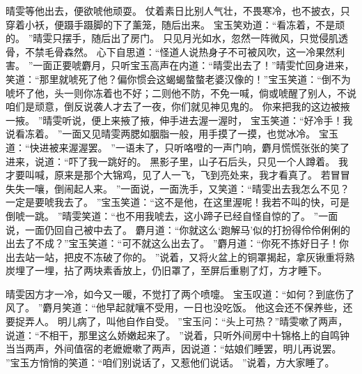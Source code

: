 晴雯等他出去，便欲唬他顽耍。
仗着素日比别人气壮，不畏寒冷，也不披衣，只穿着小袄，便蹑手蹑脚的下了薰笼，随后出来。
宝玉笑劝道：“看冻着，不是顽的。
”晴雯只摆手，随后出了房门。
只见月光如水，忽然一阵微风，只觉侵肌透骨，不禁毛骨森然。
心下自思道：“怪道人说热身子不可被风吹，这一冷果然利害。
”一面正要唬麝月，只听宝玉高声在内道：“晴雯出去了！”晴雯忙回身进来，笑道：“那里就唬死了他？偏你惯会这蝎蝎螫螫老婆汉像的！”宝玉笑道：“倒不为唬坏了他，头一则你冻着也不好；二则他不防，不免一喊，倘或唬醒了别人，不说咱们是顽意，倒反说袭人才去了一夜，你们就见神见鬼的。
你来把我的这边被掖一掖。
”晴雯听说，便上来掖了掖，伸手进去渥一渥时，
宝玉笑道：“好冷手！我说看冻着。
”一面又见晴雯两腮如胭脂一般，用手摸了一摸，也觉冰冷。
宝玉道：“快进被来渥渥罢。
”一语未了，只听咯噔的一声门响，麝月慌慌张张的笑了进来，说道：“吓了我一跳好的。
黑影子里，山子石后头，只见一个人蹲着。
我才要叫喊，原来是那个大锦鸡，见了人一飞，飞到亮处来，我才看真了。
若冒冒失失一嚷，倒闹起人来。
”一面说，一面洗手，又笑道：“晴雯出去我怎么不见？一定是要唬我去了。
”宝玉笑道：“这不是他，在这里渥呢！我若不叫的快，可是倒唬一跳。
”晴雯笑道：“也不用我唬去，这小蹄子已经自怪自惊的了。
”一面说，一面仍回自己被中去了。
麝月道：“你就这么‘跑解马’似的打扮得伶伶俐俐的出去了不成？”宝玉笑道：“可不就这么出去了。
”麝月道：“你死不拣好日子！你出去站一站，把皮不冻破了你的。
”说着，又将火盆上的铜罩揭起，拿灰锹重将熟炭埋了一埋，拈了两块素香放上，仍旧罩了，至屏后重剔了灯，方才睡下。
\par
晴雯因方才一冷，如今又一暖，不觉打了两个喷嚏。
宝玉叹道：“如何？到底伤了风了。
”麝月笑道：“他早起就嚷不受用，一日也没吃饭。
他这会还不保养些，还要捉弄人。
明儿病了，叫他自作自受。
”宝玉问：“头上可热？”晴雯嗽了两声，说道：“不相干，那里这么娇嫩起来了。
”说着，只听外间房中十锦格上的自鸣钟当当两声，外间值宿的老嬷嬷嗽了两声，因说道：“姑娘们睡罢，明儿再说罢。
”宝玉方悄悄的笑道：“咱们别说话了，又惹他们说话。
”说着，方大家睡了。
\par
